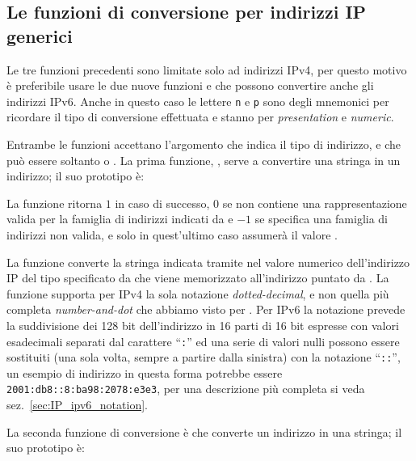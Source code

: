 \subsection{Le funzioni di conversione per indirizzi IP generici}
\label{sec:sock_conv_func_gen}

Le tre funzioni precedenti sono limitate solo ad indirizzi IPv4, per questo
motivo è preferibile usare le due nuove funzioni  e
 che possono convertire anche gli indirizzi IPv6. Anche in
questo caso le lettere \texttt{n} e \texttt{p} sono degli mnemonici per
ricordare il tipo di conversione effettuata e stanno per \textit{presentation}
e \textit{numeric}.

Entrambe le funzioni accettano l'argomento  che indica il tipo di
indirizzo, e che può essere soltanto  o . La
prima funzione, , serve a convertire una stringa in un
indirizzo; il suo prototipo è:

\begin{funcproto}{
}

{La funzione ritorna $1$ in caso di successo, $0$ se  non contiene
  una rappresentazione valida per la famiglia di indirizzi indicati
  da  e $-1$ se  specifica una famiglia di indirizzi non
  valida, e solo in quest'ultimo caso   assumerà il valore
  .
}
\end{funcproto}

La funzione converte la stringa indicata tramite  nel valore
numerico dell'indirizzo IP del tipo specificato da  che viene
memorizzato all'indirizzo puntato da . La funzione supporta
per IPv4 la sola notazione \textit{dotted-decimal}, e non quella più completa
\textit{number-and-dot} che abbiamo visto per . Per IPv6 la
notazione prevede la suddivisione dei 128 bit dell'indirizzo in 16 parti di 16
bit espresse con valori esadecimali separati dal carattere ``\texttt{:}'' ed
una serie di valori nulli possono essere sostituiti (una sola volta, sempre a
partire dalla sinistra) con la notazione ``\texttt{::}'', un esempio di
indirizzo in questa forma potrebbe essere \texttt{2001:db8::8:ba98:2078:e3e3},
per una descrizione più completa si veda sez.~\ref{sec:IP_ipv6_notation}.

La seconda funzione di conversione è  che converte un
indirizzo in una stringa; il suo prototipo è:

